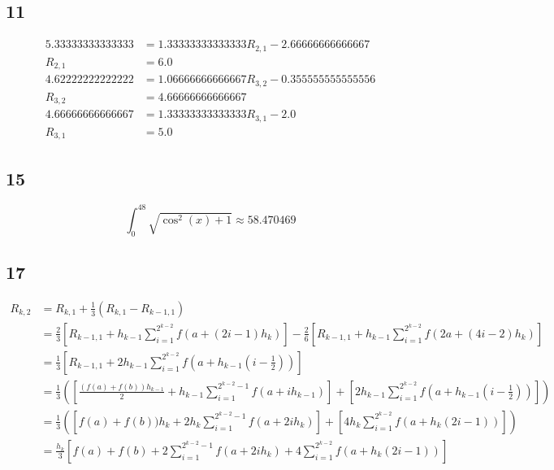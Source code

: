 \documentclass{oisinclass}
\begin{document}
\subsection*{11}
\begin{align*}
	5.33333333333333 & = 1.33333333333333 R_{2, 1} - 2.66666666666667  \\
	R_{2, 1}         & = 6.0                                           \\
	4.62222222222222 & = 1.06666666666667 R_{3, 2} - 0.355555555555556 \\
	R_{3, 2}         & = 4.66666666666667                              \\
	4.66666666666667 & = 1.33333333333333 R_{3, 1} - 2.0               \\
	R_{3, 1}         & = 5.0
\end{align*}
\subsection*{15}
\[
	\int_{0}^{48} \sqrt{\cos^{2}{\left(x \right)} + 1} \approx 58.470469
\]
\subsection*{17}
\begin{align*}
	R_{k, 2} & = R_{k, 1} + \frac{1}{3}(R_{k,1} - R_{k-1, 1})                                                                                                                                                                            \\
	         & = \frac{2}{3}\left[R_{k-1, 1} + h_{k-1} \sum_{i=1}^{2^{k-2}}f(a + (2i - 1)h_k)\right] - \frac{2}{6} \left[R_{k-1, 1} + h_{k-1} \sum_{i=1}^{2^{k-2}}f(2a + (4i - 2)h_{k})\right]                                           \\
	         & = \frac{1}{3}\left[R_{k-1, 1} + 2h_{k-1}\sum_{i=1}^{2^{k-2}}f\left(a +h_{k-1}\left(i - \frac{1}{2}\right)\right)\right]                                                                                                   \\
	         & = \frac{1}{3} \left(\left[\frac{(f(a) + f(b))h_{k-1}}{2} + h_{k-1}\sum_{i=1}^{2^{k-2} - 1}f(a + ih_{k-1}) \right] + \left[ 2h_{k-1}\sum_{i=1}^{2^{k-2}}f\left(a +h_{k-1}\left(i - \frac{1}{2}\right)\right)\right]\right) \\
	         & = \frac{1}{3} \left(\left[f(a) + f(b))h_{k} + 2h_{k}\sum_{i=1}^{2^{k-2} - 1}f(a + 2ih_{k}) \right] + \left[ 4h_{k}\sum_{i=1}^{2^{k-2}}f\left(a + h_{k}\left(2i - 1\right)\right)\right]\right)                            \\
	         & = \frac{h_k}{3} \left[f(a) + f(b) + 2\sum_{i=1}^{2^{k-2} - 1}f(a + 2ih_{k}) + 4\sum_{i=1}^{2^{k-2}}f\left(a + h_{k}\left(2i - 1\right)\right)\right]                                                                      \\
\end{align*}
\end{document}
